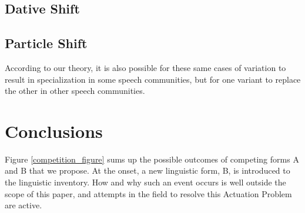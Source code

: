 

\subsection{Dative Shift}

\subsection{Particle Shift}


According to our theory, it is also possible for these same cases of variation to result in specialization in some speech communities, but for one variant to replace the other in other speech communities.

\section{Conclusions}






Figure \ref{competition_figure} sums up the possible outcomes of competing forms A and B that we propose. 
At the onset, a new linguistic form, B, is introduced to the linguistic inventory.
How and why such an event occurs is well outside the scope of this paper, and attempts in the field to resolve this Actuation Problem are active.






